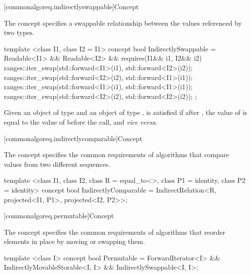 [commonalgoreq.indirectlyswappable]{Concept }

\pnum
The  concept specifies a swappable relationship between the
values referenced by two  types.

%
\begin{codeblock}
  template <class I1, class I2 = I1>
  concept bool IndirectlySwappable =
    Readable<I1> && Readable<I2> &&
    requires(I1&& i1, I2&& i2) {
      ranges::iter_swap(std::forward<I1>(i1), std::forward<I2>(i2));
      ranges::iter_swap(std::forward<I2>(i2), std::forward<I1>(i1));
      ranges::iter_swap(std::forward<I1>(i1), std::forward<I1>(i1));
      ranges::iter_swap(std::forward<I2>(i2), std::forward<I2>(i2));
    };
\end{codeblock}

\pnum
Given an object  of type  and an object  of
type ,  is satisfied if after
, the value of  is equal to the
value of  before the call, and \textit{vice versa}.

[commonalgoreq.indirectlycomparable]{Concept }

\pnum
The  concept specifies the common requirements of algorithms that
compare values from two different sequences.

%
\begin{codeblock}
  template <class I1, class I2, class R = equal_to<>, class P1 = identity,
    class P2 = identity>
  concept bool IndirectlyComparable =
    IndirectRelation<R, projected<I1, P1>, projected<I2, P2>>;
\end{codeblock}

[commonalgoreq.permutable]{Concept }

\pnum
The  concept specifies the common requirements of algorithms that reorder
elements in place by moving or swapping them.

%
\begin{codeblock}
  template <class I>
  concept bool Permutable =
    ForwardIterator<I> &&
    IndirectlyMovableStorable<I, I> &&
    IndirectlySwappable<I, I>;
\end{codeblock}

